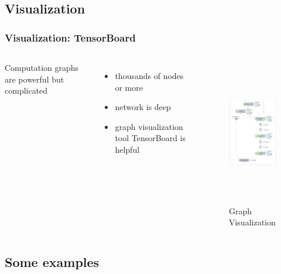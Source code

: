 \subsection{Visualization}

\begin{frame}
  \MyLogo
  \frametitle{Visualization: TensorBoard}  

\begin{columns}
\scriptsize{
Computation graphs are powerful but complicated
\begin{itemize}
\item  thousands of nodes or more 
\item  network is deep
\item  graph visualization tool TensorBoard is helpful
\end{itemize}
}
%
\begin{figure}[htbp] 
   \includegraphics[height=2.5in]{figures/graphvisualization.png} 
\caption{Graph Visualization}
\end{figure}
\end{columns}

\end{frame}

\subsection{Some examples}

